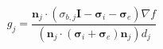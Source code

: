 $$
g_j = \frac{\mathbf n_j\cdot\left(\sigma_{b,j}\mathbf I-\boldsymbol\sigma_i-\boldsymbol\sigma_e\right)\nabla f}{\left(\mathbf n_j\cdot\left(\boldsymbol\sigma_i+\boldsymbol\sigma_e\right)\mathbf n_j\right) d_j}
$$
